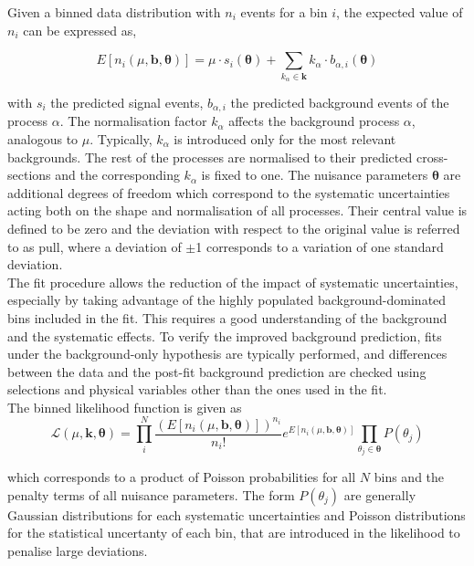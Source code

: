 Given a binned data distribution with $n_i$ events for a bin $i$, the expected value of $n_i$ can be expressed as,

\begin{equation}
    E[n_i(\mu,\mathbf{b},\boldsymbol{\theta})] = \mu\cdot s_i(\boldsymbol{\theta}) + \sum_{k_{\alpha}\in\mathbf{k}}k_\alpha\cdot b_{\alpha,i}(\boldsymbol{\theta})
\end{equation}

with $s_i$ the predicted signal events, $b_{\alpha,i}$ the predicted background events of the process $\alpha$. The normalisation factor $k_\alpha$ affects the background process $\alpha$, analogous to $\mu$. Typically, $k_\alpha$ is introduced only for the most relevant backgrounds. The rest of the processes are normalised to their predicted cross-sections and the corresponding $k_\alpha$ is fixed to one. The nuisance parameters $\boldsymbol{\theta}$ are additional degrees of freedom which correspond to the systematic uncertainties acting both on the shape and normalisation of all processes. Their central value is defined to be zero and the deviation with respect to the original value is referred to as pull, where a deviation of $\pm$1 corresponds to a variation of one standard deviation.\\

The fit procedure allows the reduction of the impact of systematic uncertainties, especially by taking advantage of the highly populated background-dominated bins included in the fit. This requires a good understanding of the background and the systematic effects. To verify the improved background prediction, fits under the background-only hypothesis are typically performed, and differences between the data and the post-fit background prediction are checked using selections and physical variables other than the ones used in the fit.\\

The binned likelihood function is given as
\begin{equation}
    \mathscr{L}(\mu,\mathbf{k},\boldsymbol{\theta}) = \prod_i^N \frac{ (E[n_i(\mu,\mathbf{b},\boldsymbol{\theta})])^{n_i}}{n_i!}e^{E[n_i(\mu,\mathbf{b},\boldsymbol{\theta})]}\prod_{\theta_j\in\boldsymbol{\theta}}P(\theta_j)
\end{equation}

which corresponds to a product of Poisson probabilities for all $N$ bins and the penalty terms of all nuisance parameters. The form $P(\theta_j)$ are generally Gaussian distributions for each systematic uncertainties and Poisson distributions for the statistical uncertanty of each bin, that are introduced in the likelihood to penalise large deviations.\\



